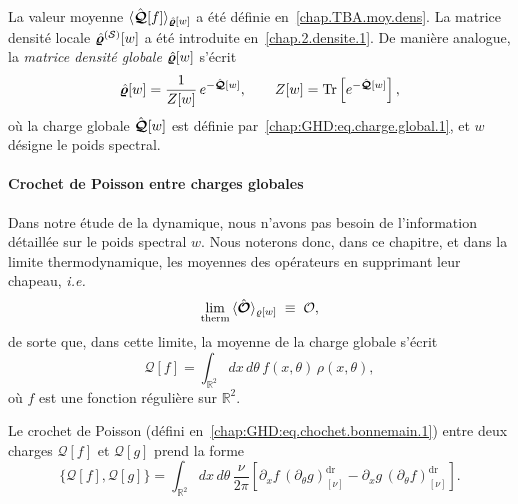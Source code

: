 \medskip

La valeur moyenne $\langle \hat{\bm{\mathcal{Q}}}[f] \rangle_{\hat{\bm{\varrho}}[w]}$ a été définie en~\eqref{chap.TBA.moy.dens}.  
La matrice densité locale $\hat{\bm{\varrho}}^{(\mathcal{S})}[w]$ a été introduite en~\eqref{chap.2.densite.1}.  
De manière analogue, la \emph{matrice densité globale} $\hat{\bm{\varrho}}[w]$ s’écrit
\begin{equation}\label{chap:GHD:eq.charge.global.2}
	\hat{\bm{\varrho}}[w] 
	= \frac{1}{Z[w]}\, e^{-\hat{\bm{\mathcal{Q}}}[w]}, 
	\qquad  
	Z[w] = \mathrm{Tr} \left[ e^{-\hat{\bm{\mathcal{Q}}}[w]} \right],
\end{equation}
où la charge globale $\hat{\bm{\mathcal{Q}}}[w]$ est définie par~\eqref{chap:GHD:eq.charge.global.1}, et $w$ désigne le poids spectral.  


\medskip

\paragraph{Crochet de Poisson entre charges globales}  
Dans notre étude de la dynamique, nous n’avons pas besoin de l’information détaillée sur le poids spectral $w$.  
Nous noterons donc, dans ce chapitre, et dans la limite thermodynamique, les moyennes des opérateurs en supprimant leur chapeau, \emph{i.e.}
\begin{equation}
\underset{\mathrm{therm}}{\lim} \, \langle \hat{\bm{\mathcal{O}}} \rangle_{\varrho[w]} \; \equiv \; \mathcal{O},
\end{equation}
de sorte que, dans cette limite, la moyenne de la charge globale s’écrit
\begin{equation}\label{chap:GHD:eq.charge.global.1}
	\mathcal{Q}[f] 
	= \int_{\mathbb{R}^2} dx\, d\theta\, f(x, \theta)\, \rho(x, \theta),
\end{equation}
où $f$ est une fonction régulière sur $\mathbb{R}^2$.

\medskip

Le crochet de Poisson (défini en~\eqref{chap:GHD:eq.chochet.bonnemain.1}) entre deux charges $\mathcal{Q}[f]$ et $\mathcal{Q}[g]$ prend la forme
\begin{equation}\label{chap:GHD:eq.chochet.bonnemain.2}
	\{\mathcal{Q}[f], \mathcal{Q}[g]\}
	= \int_{\mathbb{R}^2} dx\, d\theta\, \frac{\nu}{2\pi} 
	\left[ \partial_x f \, (\partial_\theta g)^{\mathrm{dr}}_{[\nu]} 
	     - \partial_x g \, (\partial_\theta f)^{\mathrm{dr}}_{[\nu]} \right].
\end{equation}


